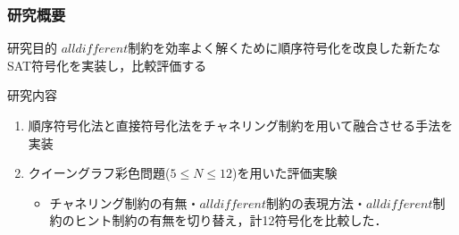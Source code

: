 \documentclass [dvipdfmx,11pt]{beamer}
\newcommand{\alldifferent}{$alldifferent$}
\begin{document}
\begin{frame}
    \frametitle{研究概要}
    \begin{alertblock}{研究目的}
        {\alldifferent}制約を効率よく解くために順序符号化を改良した新たなSAT符号化を実装し，比較評価する
    \end{alertblock}
    \begin{block}{研究内容}
        \begin{enumerate}
            \item 順序符号化法と直接符号化法をチャネリング制約を用いて融合させる手法を実装
            \item クイーングラフ彩色問題($5\leq N \leq 12$)を用いた評価実験
                \begin{itemize}
                    \item チャネリング制約の有無・{\alldifferent}制約の表現方法・{\alldifferent}制約のヒント制約の有無を切り替え，計12符号化を比較した．
                \end{itemize}
        \end{enumerate}
    \end{block}
\end{frame}
\end{document}
